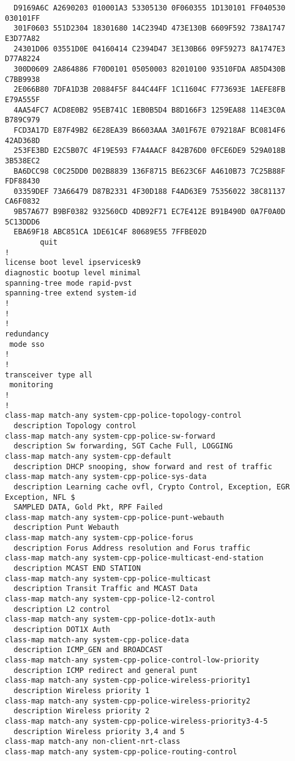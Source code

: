 \begin{verbatim}
  D9169A6C A2690203 010001A3 53305130 0F060355 1D130101 FF040530 030101FF
  301F0603 551D2304 18301680 14C2394D 473E130B 6609F592 738A1747 E3D77A82
  24301D06 03551D0E 04160414 C2394D47 3E130B66 09F59273 8A1747E3 D77A8224
  300D0609 2A864886 F70D0101 05050003 82010100 93510FDA A85D430B C7BB9938
  2E066B80 7DFA1D3B 20884F5F 844C44FF 1C11604C F773693E 1AEFE8FB E79A555F
  4AA54FC7 ACD8E0B2 95EB741C 1EB0B5D4 B8D166F3 1259EA88 114E3C0A B789C979
  FCD3A17D E87F49B2 6E28EA39 B6603AAA 3A01F67E 079218AF BC0814F6 42AD368D
  253FE3BD E2C5B07C 4F19E593 F7A4AACF 842B76D0 0FCE6DE9 529A018B 3B538EC2
  BA6DCC98 C0C25DD0 D02B8839 136F8715 BE623C6F A4610B73 7C25B88F FDF88430
  03359DEF 73A66479 D87B2331 4F30D188 F4AD63E9 75356022 38C81137 CA6F0832
  9B57A677 B9BF0382 932560CD 4DB92F71 EC7E412E B91B490D 0A7F0A0D 5C13DDD6
  EBA69F18 ABC851CA 1DE61C4F 80689E55 7FFBE02D
        quit
!
license boot level ipservicesk9
diagnostic bootup level minimal
spanning-tree mode rapid-pvst
spanning-tree extend system-id
!
!
!
redundancy
 mode sso
!
!
transceiver type all
 monitoring
!
!
class-map match-any system-cpp-police-topology-control
  description Topology control
class-map match-any system-cpp-police-sw-forward
  description Sw forwarding, SGT Cache Full, LOGGING
class-map match-any system-cpp-default
  description DHCP snooping, show forward and rest of traffic
class-map match-any system-cpp-police-sys-data
  description Learning cache ovfl, Crypto Control, Exception, EGR Exception, NFL $
  SAMPLED DATA, Gold Pkt, RPF Failed
class-map match-any system-cpp-police-punt-webauth
  description Punt Webauth
class-map match-any system-cpp-police-forus
  description Forus Address resolution and Forus traffic
class-map match-any system-cpp-police-multicast-end-station
  description MCAST END STATION
class-map match-any system-cpp-police-multicast
  description Transit Traffic and MCAST Data
class-map match-any system-cpp-police-l2-control
  description L2 control
class-map match-any system-cpp-police-dot1x-auth
  description DOT1X Auth
class-map match-any system-cpp-police-data
  description ICMP_GEN and BROADCAST
class-map match-any system-cpp-police-control-low-priority
  description ICMP redirect and general punt
class-map match-any system-cpp-police-wireless-priority1
  description Wireless priority 1
class-map match-any system-cpp-police-wireless-priority2
  description Wireless priority 2
class-map match-any system-cpp-police-wireless-priority3-4-5
  description Wireless priority 3,4 and 5
class-map match-any non-client-nrt-class
class-map match-any system-cpp-police-routing-control

\end{verbatim}
